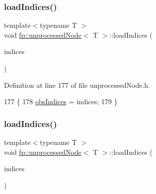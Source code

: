 \subsubsection{\texorpdfstring{load\+Indices()}{loadIndices()}\hspace{0.1cm}{\footnotesize\ttfamily [1/2]}}
{\footnotesize\ttfamily template$<$typename T $>$ \\
void \hyperlink{classfp_1_1unprocessedNode}{fp\+::unprocessed\+Node}$<$ T $>$\+::load\+Indices (\begin{DoxyParamCaption}\item[{\hyperlink{classfp_1_1stratifiedInNodeClassIndices}{stratified\+In\+Node\+Class\+Indices} $\ast$}]{indices }\end{DoxyParamCaption})\hspace{0.3cm}{\ttfamily [inline]}}



Definition at line 177 of file unprocessed\+Node.\+h.


\begin{DoxyCode}
177                                                                               \{
178                     \hyperlink{classfp_1_1unprocessedNode_aba9f03124658f62906fa8ded53cef535}{obsIndices} = indices;
179                 \}
\end{DoxyCode}
\mbox{\label{classfp_1_1unprocessedNode_af5580595b612e9b3f5ddc4f28c43775c}} 
\subsubsection{\texorpdfstring{load\+Indices()}{loadIndices()}\hspace{0.1cm}{\footnotesize\ttfamily [2/2]}}
{\footnotesize\ttfamily template$<$typename T $>$ \\
void \hyperlink{classfp_1_1unprocessedNode}{fp\+::unprocessed\+Node}$<$ T $>$\+::load\+Indices (\begin{DoxyParamCaption}\item[{\hyperlink{classfp_1_1stratifiedInNodeClassIndices}{stratified\+In\+Node\+Class\+Indices} $\ast$}]{indices }\end{DoxyParamCaption})\hspace{0.3cm}{\ttfamily [inline]}}




